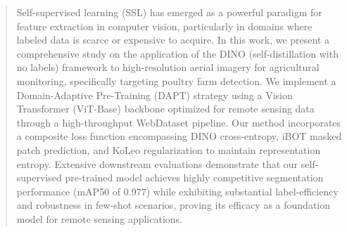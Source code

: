 \begin{abstract}
Self-supervised learning (SSL) has emerged as a powerful paradigm for feature extraction in computer vision, particularly in domains where labeled data is scarce or expensive to acquire. In this work, we present a comprehensive study on the application of the DINO (self-distillation with no labels) framework to high-resolution aerial imagery for agricultural monitoring, specifically targeting poultry farm detection. We implement a Domain-Adaptive Pre-Training (DAPT) strategy using a Vision Transformer (ViT-Base) backbone optimized for remote sensing data through a high-throughput WebDataset pipeline. Our method incorporates a composite loss function encompassing DINO cross-entropy, iBOT masked patch prediction, and KoLeo regularization to maintain representation entropy. Extensive downstream evaluations demonstrate that our self-supervised pre-trained model achieves highly competitive segmentation performance (mAP50 of 0.977) while exhibiting substantial label-efficiency and robustness in few-shot scenarios, proving its efficacy as a foundation model for remote sensing applications.
\end{abstract}